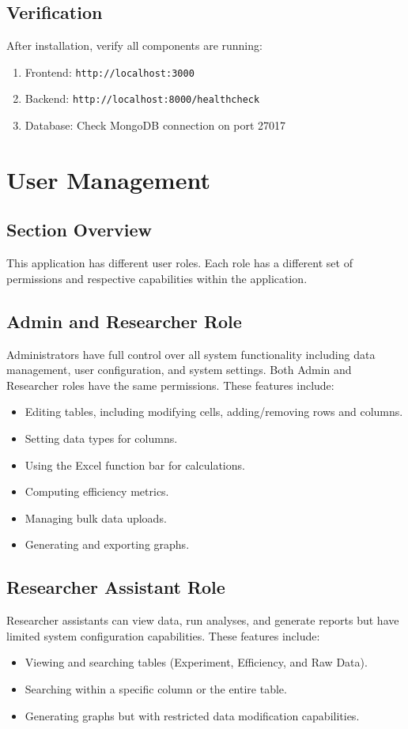 \documentclass[12pt]{article}
\begin{document}
\subsection{Verification}
After installation, verify all components are running:
\begin{enumerate}
    \item Frontend: \texttt{http://localhost:3000}
    \item Backend: \texttt{http://localhost:8000/healthcheck}
    \item Database: Check MongoDB connection on port 27017
\end{enumerate}

\section{User Management}
\subsection*{Section Overview}
This application has different user roles. Each role has a different set of
permissions and respective capabilities within the application.

\subsection{Admin and Researcher Role}
Administrators have full control over all system functionality including data
management, user configuration, and system settings. Both Admin and Researcher
roles have the same permissions. \newline \newline
These features include:
\begin{itemize}
    \item Editing tables, including modifying cells, adding/removing rows and columns.
    \item Setting data types for columns.
    \item Using the Excel function bar for calculations.
    \item Computing efficiency metrics.
    \item Managing bulk data uploads.
    \item Generating and exporting graphs.
\end{itemize}

\subsection{Researcher Assistant Role}
Researcher assistants can view data, run analyses, and generate reports but have limited
system configuration capabilities. \newline\newline
These features include:
\begin{itemize}
    \item Viewing and searching tables (Experiment, Efficiency, and Raw Data).
    \item Searching within a specific column or the entire table.
    \item Generating graphs but with restricted data modification capabilities.
\end{itemize}
\end{document}
